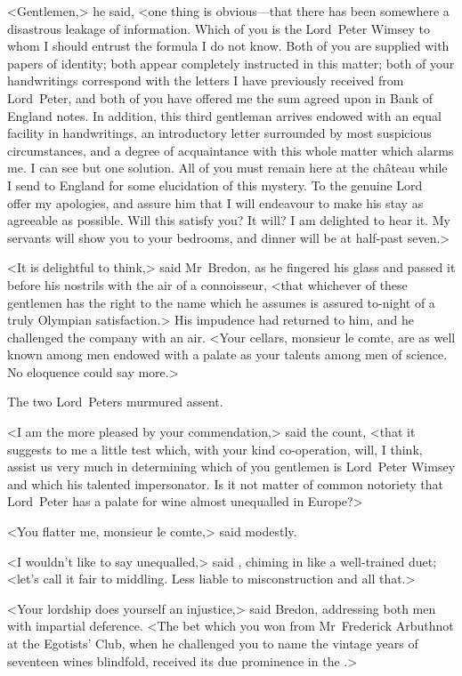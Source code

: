 <Gentlemen,> he said, <one thing is obvious—that there has been somewhere a disastrous leakage of information. Which of you is the Lord~Peter Wimsey to whom I should entrust the formula I do not know. Both of you are supplied with papers of identity; both appear completely instructed in this matter; both of your handwritings correspond with the letters I have previously received from Lord~Peter, and both of you have offered me the sum agreed upon in Bank of England notes. In addition, this third gentleman arrives endowed with an equal facility in handwritings, an introductory letter surrounded by most suspicious circumstances, and a degree of acquaintance with this whole matter which alarms me. I can see but one solution. All of you must remain here at the château while I send to England for some elucidation of this mystery. To the genuine Lord~ offer my apologies, and assure him that I will endeavour to make his stay as agreeable as possible. Will this satisfy you? It will? I am delighted to hear it. My servants will show you to your bedrooms, and dinner will be at half-past seven.>

\divider
<It is delightful to think,> said Mr~Bredon, as he fingered his glass and passed it before his nostrils with the air of a connoisseur, <that whichever of these gentlemen has the right to the name which he assumes is assured to-night of a truly Olympian satisfaction.> His impudence had returned to him, and he challenged the company with an air. <Your cellars, monsieur le comte, are as well known among men endowed with a palate as your talents among men of science. No eloquence could say more.>

The two Lord~Peters murmured assent.

<I am the more pleased by your commendation,> said the count, <that it suggests to me a little test which, with your kind co-operation, will, I think, assist us very much in determining which of you gentlemen is Lord~Peter Wimsey and which his talented impersonator. Is it not matter of common notoriety that Lord~Peter has a palate for wine almost unequalled in Europe?>

<You flatter me, monsieur le comte,> said  modestly.

<I wouldn't like to say unequalled,> said , chiming in like a well-trained duet; <let's call it fair to middling. Less liable to misconstruction and all that.>

<Your lordship does yourself an injustice,> said Bredon, addressing both men with impartial deference. <The bet which you won from Mr~Frederick Arbuthnot at the Egotists' Club, when he challenged you to name the vintage years of seventeen wines blindfold, received its due prominence in the .>

